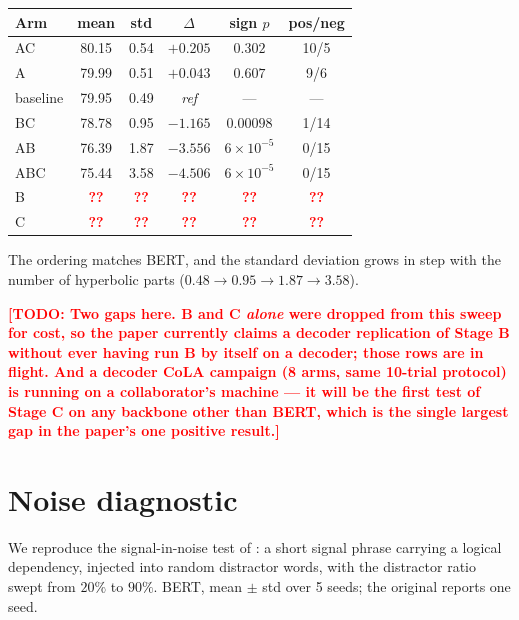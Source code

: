 \documentclass{article}
\newcommand{\PEND}{\textcolor{red}{\textbf{??}}}
\newcommand{\TODO}[1]{\textcolor{red}{\textbf{[TODO: #1]}}}
\begin{document}
\begin{center}
\small
\begin{tabular}{lccccc}
\toprule
Arm & mean & std & $\Delta$ & sign $p$ & pos/neg \\
\midrule
AC       & 80.15 & 0.54 & $+0.205$ & $0.302$ & 10/5 \\
A        & 79.99 & 0.51 & $+0.043$ & $0.607$ & \phantom{0}9/6 \\
baseline & 79.95 & 0.49 & \emph{ref} & --- & --- \\
\midrule
BC       & 78.78 & 0.95 & $-1.165$ & $0.00098$ & \phantom{0}1/14 \\
AB       & 76.39 & 1.87 & $-3.556$ & $6\times10^{-5}$ & \phantom{0}0/15 \\
ABC      & 75.44 & 3.58 & $-4.506$ & $6\times10^{-5}$ & \phantom{0}0/15 \\
\midrule
B        & \PEND & \PEND & \PEND & \PEND & \PEND \\
C        & \PEND & \PEND & \PEND & \PEND & \PEND \\
\bottomrule
\end{tabular}
\end{center}

The ordering matches BERT, and the standard deviation grows in step with the
number of hyperbolic parts ($0.48 \rightarrow 0.95 \rightarrow 1.87 \rightarrow
3.58$).

\TODO{Two gaps here. B and C \emph{alone} were dropped from this sweep for
cost, so the paper currently claims a decoder replication of Stage B without
ever having run B by itself on a decoder; those rows are in flight. And a
decoder CoLA campaign (8 arms, same 10-trial protocol) is running on a
collaborator's machine --- it will be the first test of Stage C on any backbone
other than BERT, which is the single largest gap in the paper's one positive
result.}

\section{Noise diagnostic}
\label{app:stress}

We reproduce the signal-in-noise test of \citet{mantri2026glot}: a short signal
phrase carrying a logical dependency, injected into random distractor words,
with the distractor ratio swept from $20\%$ to $90\%$. BERT, mean $\pm$ std over
5 seeds; the original reports one seed.
\end{document}
